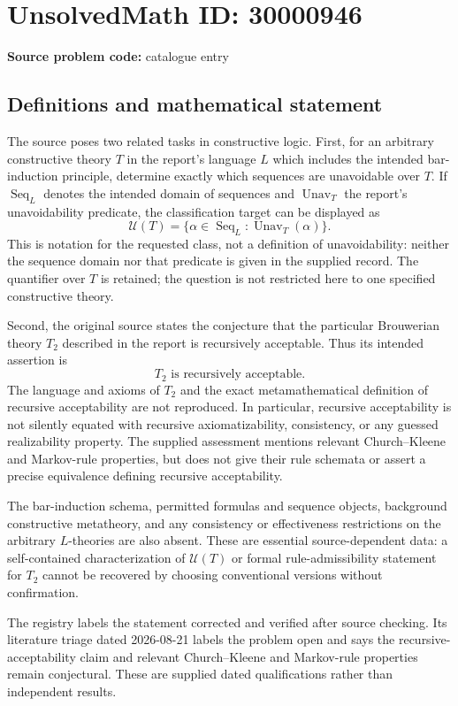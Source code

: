 \documentclass[11pt]{article}
\begin{document}
\section*{UnsolvedMath ID: 30000946}
\textbf{Source problem code:} catalogue entry
\subsection{Definitions and mathematical statement}
The source poses two related tasks in constructive logic. First, for an arbitrary constructive theory $T$ in the report's language $L$ which includes the intended bar-induction principle, determine exactly which sequences are unavoidable over $T$. If $\operatorname{Seq}_L$ denotes the intended domain of sequences and $\operatorname{Unav}_T$ the report's unavoidability predicate, the classification target can be displayed as
\[
\mathcal U(T)=\{\alpha\in\operatorname{Seq}_L:\operatorname{Unav}_T(\alpha)\}.
\]
This is notation for the requested class, not a definition of unavoidability: neither the sequence domain nor that predicate is given in the supplied record. The quantifier over $T$ is retained; the question is not restricted here to one specified constructive theory.

Second, the original source states the conjecture that the particular Brouwerian theory $T_2$ described in the report is recursively acceptable. Thus its intended assertion is
\[
T_2\text{ is recursively acceptable}.
\]
The language and axioms of $T_2$ and the exact metamathematical definition of recursive acceptability are not reproduced. In particular, recursive acceptability is not silently equated with recursive axiomatizability, consistency, or any guessed realizability property. The supplied assessment mentions relevant Church--Kleene and Markov-rule properties, but does not give their rule schemata or assert a precise equivalence defining recursive acceptability.

The bar-induction schema, permitted formulas and sequence objects, background constructive metatheory, and any consistency or effectiveness restrictions on the arbitrary $L$-theories are also absent. These are essential source-dependent data: a self-contained characterization of $\mathcal U(T)$ or formal rule-admissibility statement for $T_2$ cannot be recovered by choosing conventional versions without confirmation.

The registry labels the statement corrected and verified after source checking. Its literature triage dated 2026-08-21 labels the problem open and says the recursive-acceptability claim and relevant Church--Kleene and Markov-rule properties remain conjectural. These are supplied dated qualifications rather than independent results.
\end{document}
